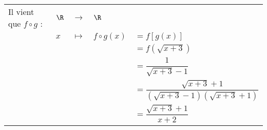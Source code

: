 \begin{tabular}{lllll}
Il vient que $f \circ g$ : & $\R$ & $\longrightarrow$ & $\R$ & \\
& $x$ & $\longmapsto$ & $f \circ g\left(x\right) $ & $= f\left[g\left(x\right)\right]$ \vspace*{.3cm} \\
& & & & $=f\left(\sqrt{x+3}\right)$ \vspace*{.3cm} \\
& & & & $= \dfrac{1}{\sqrt{x+3} - 1}$ \vspace*{.3cm} \\
& & & & $= \dfrac{\sqrt{x+3} +1}{\left(\sqrt{x+3} - 1\right)\left(\sqrt{x+3}+1\right)}$ \vspace*{.3cm} \\ 
& & & & $= \dfrac{\sqrt{x+3} +1}{x+2}$ \vspace*{.3cm} \\ 
\end{tabular}